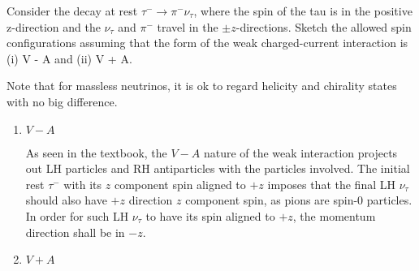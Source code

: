 \begin{problem}{11.5}
Consider the decay at rest $\tau^-\to\pi^-\nu_\tau$, where the spin of the tau is in the positive z-direction and the $\nu_\tau$ and $\pi^-$ travel in the $\pm z$-directions. Sketch the allowed spin configurations assuming that the form of the weak charged-current interaction is (i) V - A and (ii) V + A.
\end{problem}
\begin{solution}
    Note that for massless neutrinos, it is ok to regard helicity and chirality states with no big difference. 
    \begin{enumerate}[label=(\roman*)]
        \item $V-A$
        
        \begin{center}
        \end{center}\vspace{0.1in}

        As seen in the textbook, the $V-A$ nature of the weak interaction projects out LH particles and RH antiparticles with the particles involved. The initial rest $\tau^-$ with its $z$ component spin aligned to $+z$ imposes that the final LH $\nu_\tau$ should also have $+z$ direction $z$ component spin, as pions are spin-0 particles. In order for such LH $\nu_\tau$ to have its spin aligned to $+z$, the momentum direction shall be in $-z$.  \vspace{0.1in}

        \item $V+A$
        

\end{enumerate}
\end{solution}
